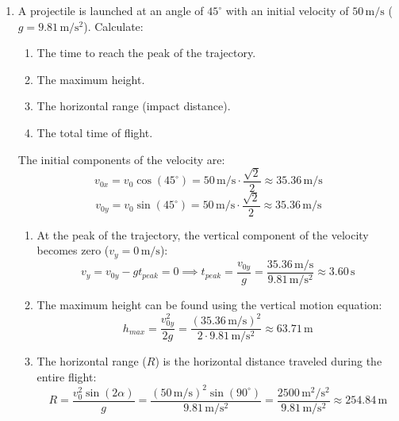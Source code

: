 \documentclass[12pt]{letter}
\begin{document}
\begin{enumerate}
\bigskip
\item A projectile is launched at an angle of $45^\circ$ with an initial velocity of $50\,\text{m/s}$ ($g=9.81\,\mathrm{m/s^{2}}$). 
Calculate:
\begin{enumerate}
    \item[(a)] The time to reach the peak of the trajectory.
    \item[(b)] The maximum height.
    \item[(c)] The horizontal range (impact distance).
    \item[(d)] The total time of flight.
\end{enumerate}     


\begin{center}
\end{center}

The initial components of the velocity are:
$$v_{0x} = v_0 \cos(45^\circ) = 50\,\mathrm{m/s} \cdot \frac{\sqrt{2}}{2} \approx 35.36\,\mathrm{m/s}$$
$$v_{0y} = v_0 \sin(45^\circ) = 50\,\mathrm{m/s} \cdot \frac{\sqrt{2}}{2} \approx 35.36\,\mathrm{m/s}$$
\begin{enumerate}
\item[(a)] At the peak of the trajectory, the vertical component of the velocity becomes zero ($v_y = 0\,\mathrm{m/s}$):
$$v_y = v_{0y} - gt_{peak} = 0 \implies t_{peak} = \frac{v_{0y}}{g} = \frac{35.36\,\mathrm{m/s}}{9.81\,\mathrm{m/s^2}} \approx 3.60\,\mathrm{s}$$

\item[(b)] The maximum height can be found using the vertical motion equation:
$$h_{max} = \frac{v_{0y}^2}{2g} = \frac{(35.36\,\mathrm{m/s})^2}{2 \cdot 9.81\,\mathrm{m/s^2}} \approx 63.71\,\mathrm{m}$$

\item[(c)] The horizontal range ($R$) is the horizontal distance traveled during the entire flight:
$$R = \frac{v_0^2 \sin(2\alpha)}{g} = \frac{(50\,\mathrm{m/s})^2 \sin(90^\circ)}{9.81\,\mathrm{m/s^2}} = \frac{2500\,\mathrm{m^2/s^2}}{9.81\,\mathrm{m/s^2}} \approx 254.84\,\mathrm{m}$$


\end{enumerate}
\end{enumerate}
\end{document}
